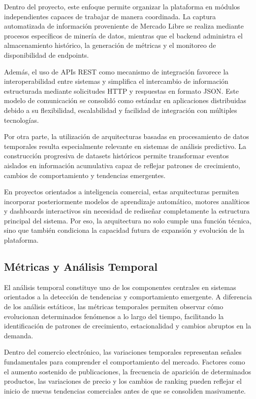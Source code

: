 Dentro del proyecto, este enfoque permite organizar la plataforma en módulos independientes capaces de trabajar de manera coordinada. La captura automatizada de información proveniente de Mercado Libre se realiza mediante procesos específicos de minería de datos, mientras que el backend administra el almacenamiento histórico, la generación de métricas y el monitoreo de disponibilidad de endpoints.

Además, el uso de APIs REST como mecanismo de integración favorece la interoperabilidad entre sistemas y simplifica el intercambio de información estructurada mediante solicitudes HTTP y respuestas en formato JSON. Este modelo de comunicación se consolidó como estándar en aplicaciones distribuidas debido a su flexibilidad, escalabilidad y facilidad de integración con múltiples tecnologías.

Por otra parte, la utilización de arquitecturas basadas en procesamiento de datos temporales resulta especialmente relevante en sistemas de análisis predictivo. La construcción progresiva de datasets históricos permite transformar eventos aislados en información acumulativa capaz de reflejar patrones de crecimiento, cambios de comportamiento y tendencias emergentes.

En proyectos orientados a inteligencia comercial, estas arquitecturas permiten incorporar posteriormente modelos de aprendizaje automático, motores analíticos y dashboards interactivos sin necesidad de rediseñar completamente la estructura principal del sistema. Por eso, la arquitectura no solo cumple una función técnica, sino que también condiciona la capacidad futura de expansión y evolución de la plataforma.

\subsection{Métricas y Análisis Temporal}

El análisis temporal constituye uno de los componentes centrales en sistemas orientados a la detección de tendencias y comportamiento emergente. A diferencia de los análisis estáticos, las métricas temporales permiten observar cómo evolucionan determinados fenómenos a lo largo del tiempo, facilitando la identificación de patrones de crecimiento, estacionalidad y cambios abruptos en la demanda.

Dentro del comercio electrónico, las variaciones temporales representan señales fundamentales para comprender el comportamiento del mercado. Factores como el aumento sostenido de publicaciones, la frecuencia de aparición de determinados productos, las variaciones de precio y los cambios de ranking pueden reflejar el inicio de nuevas tendencias comerciales antes de que se consoliden masivamente.

